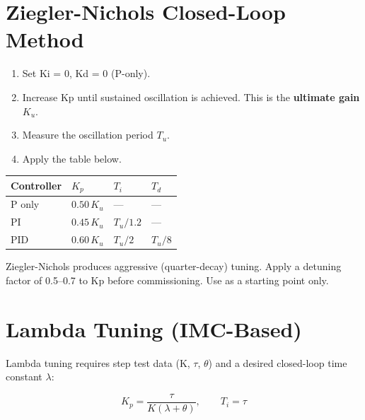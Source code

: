 \documentclass[12pt,twoside,openright]{memoir}
\begin{document}
\section{Ziegler-Nichols Closed-Loop Method}

\begin{enumerate}
  \item Set Ki = 0, Kd = 0 (P-only).
  \item Increase Kp until sustained oscillation is achieved. This is the \textbf{ultimate gain} $K_u$.
  \item Measure the oscillation period $T_u$.
  \item Apply the table below.
\end{enumerate}

\begin{tcolorbox}[
  enhanced,
  colback=pidblue!6, colframe=pidblue, arc=4pt,
  title={\sffamily\bfseries\color{white} Ziegler-Nichols Tuning Table},
  attach boxed title to top left={yshift=-2mm, xshift=6mm},
  boxed title style={colback=pidblue, arc=3pt}
]
\begin{center}
\begin{tabular}{@{}L{3cm}C{3cm}C{3cm}C{3cm}@{}}
\toprule
{}
\textbf{Controller} & $K_p$ & $T_i$ & $T_d$ \\
\midrule
P only          & $0.50\, K_u$  & ---           & --- \\
PI              & $0.45\, K_u$  & $T_u / 1.2$   & --- \\
PID             & $0.60\, K_u$  & $T_u / 2$     & $T_u / 8$ \\
\bottomrule
\end{tabular}
\end{center}
\end{tcolorbox}

\begin{warningbox}
Ziegler-Nichols produces aggressive (quarter-decay) tuning. Apply a detuning factor of 0.5--0.7 to Kp before commissioning. Use as a starting point only.
\end{warningbox}

\section{Lambda Tuning (IMC-Based)}

Lambda tuning requires step test data (K, $\tau$, $\theta$) and a desired closed-loop time constant $\lambda$:

\[
K_p = \frac{\tau}{K(\lambda + \theta)}, \qquad T_i = \tau
\]
\end{document}
